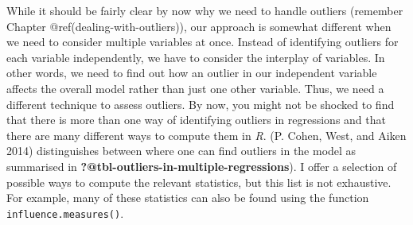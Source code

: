 \documentclass[
  letterpaper,
]{krantz}
\begin{document}
While it should be fairly clear by now why we need to handle outliers
(remember Chapter @ref(dealing-with-outliers)), our approach is somewhat
different when we need to consider multiple variables at once. Instead
of identifying outliers for each variable independently, we have to
consider the interplay of variables. In other words, we need to find out
how an outlier in our independent variable affects the overall model
rather than just one other variable. Thus, we need a different technique
to assess outliers. By now, you might not be shocked to find that there
is more than one way of identifying outliers in regressions and that
there are many different ways to compute them in \emph{R}. (P. Cohen,
West, and Aiken 2014) distinguishes between where one can find outliers
in the model as summarised in
\textbf{?@tbl-outliers-in-multiple-regressions}). I offer a selection of
possible ways to compute the relevant statistics, but this list is not
exhaustive. For example, many of these statistics can also be found
using the function \texttt{influence.measures()}.
\end{document}
